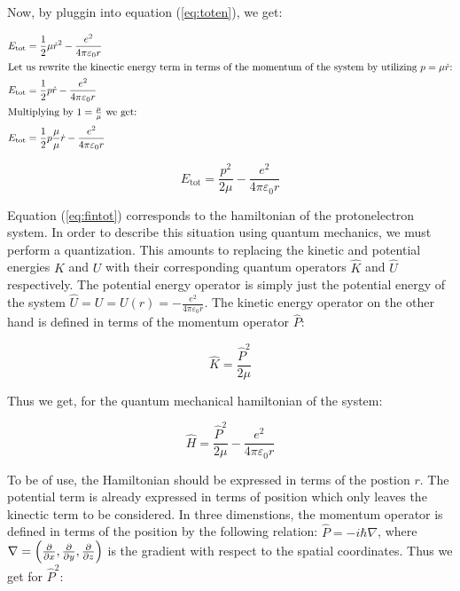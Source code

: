 \documentclass{article}
\begin{document}
    Now, by pluggin into equation (\ref{eq:toten}), we get:

    \begin{align}
        E_{\mathrm{tot}} &= \frac{1}{2}\mu\dot{r}^2 - \frac{e^2}{4\pi\varepsilon_{0}r} \\
        \intertext{Let us rewrite the kinectic energy term in terms of the momentum of the system by utilizing $p = \mu \dot{r}$:}
        E_{\mathrm{tot}} &= \frac{1}{2}p\dot{r} - \frac{e^2}{4\pi\varepsilon_{0}r} \\
        \intertext{Multiplying by $1 = \frac{\mu}{\mu}$ we get:}
        E_{\mathrm{tot}} &= \frac{1}{2}p\frac{\mu}{\mu}\dot{r} - \frac{e^2}{4\pi\varepsilon_{0}r}
    \end{align}

    \begin{equation}
        \label{eq:fintot}
        E_{\mathrm{tot}} = \frac{p^2}{2\mu} - \frac{e^2}{4\pi\varepsilon_{0}r}
    \end{equation}

    Equation (\ref{eq:fintot}) corresponds to the hamiltonian of the proton\textendash electron system. In order to describe this situation using quantum mechanics,
    we must perform a quantization. This amounts to replacing the kinetic and potential energies $K$ and $U$ with their corresponding quantum operators $\hat{K}$ and $\hat{U}$ respectively.
    The potential energy operator is simply just the potential energy of the system $\hat{U} = U = U(r) = -\frac{e^2}{4\pi\varepsilon_{0}r}$. The kinetic energy operator on the other hand is
    defined in terms of the momentum operator $\hat{P}$:

    \begin{equation}
        \hat{K} = \frac{\hat{P}^2}{2\mu}
    \end{equation}

    Thus we get, for the quantum mechanical hamiltonian of the system:

    \begin{equation}
        \hat{H} = \frac{\hat{P}^2}{2\mu} - \frac{e^{2}}{4\pi\varepsilon_{0}r}
    \end{equation}

    To be of use, the Hamiltonian should be expressed in terms of the postion $r$. The potential term is already expressed in terms of position which only leaves the kinectic term to be considered.
    In three dimenstions, the momentum operator is defined in terms of the position by the following relation: $\hat{P} = -i\hbar\nabla$, where $\nabla = \left( \pdv{}{x}, \pdv{}{y}, \pdv{}{z} \right)$ is the
    gradient with respect to the spatial coordinates. Thus we get for $\hat{P}^{2}$:
\end{document}
